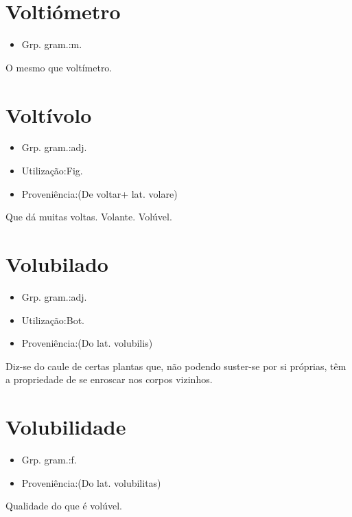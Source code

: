 \documentclass{article}
\begin{document}
\section{Voltiómetro}
\begin{itemize}
\item {Grp. gram.:m.}
\end{itemize}
O mesmo que \textunderscore voltímetro\textunderscore .
\section{Voltívolo}
\begin{itemize}
\item {Grp. gram.:adj.}
\end{itemize}
\begin{itemize}
\item {Utilização:Fig.}
\end{itemize}
\begin{itemize}
\item {Proveniência:(De \textunderscore voltar\textunderscore  + lat. \textunderscore volare\textunderscore )}
\end{itemize}
Que dá muitas voltas.
Volante.
Volúvel.
\section{Volubilado}
\begin{itemize}
\item {Grp. gram.:adj.}
\end{itemize}
\begin{itemize}
\item {Utilização:Bot.}
\end{itemize}
\begin{itemize}
\item {Proveniência:(Do lat. \textunderscore volubilis\textunderscore )}
\end{itemize}
Diz-se do caule de certas plantas que, não podendo suster-se por si próprias, têm a propriedade de se enroscar nos corpos vizinhos.
\section{Volubilidade}
\begin{itemize}
\item {Grp. gram.:f.}
\end{itemize}
\begin{itemize}
\item {Proveniência:(Do lat. \textunderscore volubilitas\textunderscore )}
\end{itemize}
Qualidade do que é volúvel.
\end{document}
